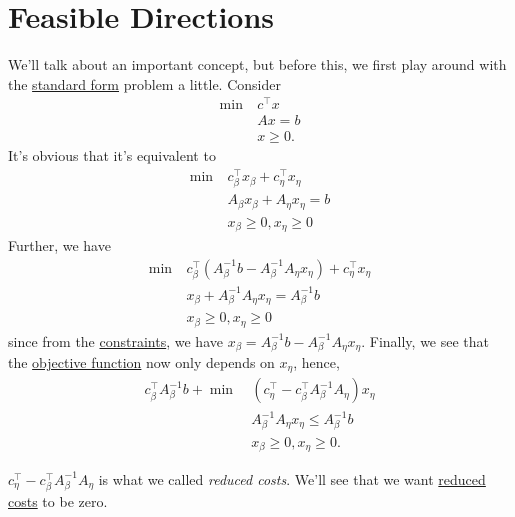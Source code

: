 \section{Feasible Directions}
We'll talk about an important concept, but before this, we first play around with the \hyperref[def:standard-form]{standard form} problem a little. Consider
\[
	\begin{aligned}
		\min~ & c^{\top}x \\
		      & Ax = b    \\
		      & x\geq 0.
	\end{aligned}
\]
It's obvious that it's equivalent to
\[
	\begin{aligned}
		\min~ & c^{\top}_{\beta}x_{\beta} + c^{\top}_{\eta}x_{\eta} \\
		      & A_{\beta}x_{\beta} + A_{\eta}x_{\eta} = b           \\
		      & x_{\beta}\geq 0, x_{\eta}\geq 0
	\end{aligned}
\]
Further, we have
\[
	\begin{aligned}
		\min~ & c^{\top}_{\beta}(A^{-1}_{\beta}b - A^{-1}_{\beta}A_{\eta}x_{\eta} ) + c_{\eta}^{\top}x_{\eta} \\
		      & x_{\beta} + A^{-1}_{\beta}A_{\eta}x_{\eta} = A^{-1}_{\beta}b                                  \\
		      & x_{\beta}\geq 0, x_{\eta}\geq 0
	\end{aligned}
\]
since from the \hyperref[def:constraints]{constraints}, we have \(x_{\beta} = A^{-1}_{\beta}b - A^{-1}_{\beta}A_{\eta}x_{\eta}\). Finally, we see that
the \hyperref[def:objective-function]{objective function} now only depends on \(x_{\eta}\), hence,
\[
	\begin{aligned}
		c^{\top}_{\beta}A^{-1}_{\beta}b + \min~ & (c_{\eta}^{\top} - c_{\beta}^{\top}A^{-1}_{\beta}A_{\eta})x_{\eta} \\
		                                        & A^{-1}_{\beta}A_{\eta}x_{\eta} \leq A^{-1}_{\beta}b                \\
		                                        & x_{\beta}\geq 0, x_{\eta}\geq 0.
	\end{aligned}
\]

\begin{note}\label{note:reduced-cost}
	\(c_{\eta}^{\top} - c_{\beta}^{\top}A^{-1}_{\beta}A_{\eta}\) is what we called \emph{reduced costs}.
	We'll see that we want \hyperref[def:reduced-cost]{reduced costs} to be zero.
\end{note}

